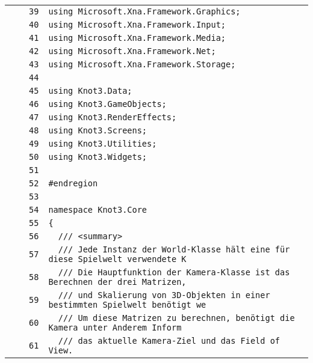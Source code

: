 \documentclass[a4paper,10pt]{article}
\begin{document}
\begin{longtable}[l]{lrrl}
\cellcolor{gray} &  & \verb~39~ & \verb~using Microsoft.Xna.Framework.Graphics;~\\
\cellcolor{gray} &  & \verb~40~ & \verb~using Microsoft.Xna.Framework.Input;~\\
\cellcolor{gray} &  & \verb~41~ & \verb~using Microsoft.Xna.Framework.Media;~\\
\cellcolor{gray} &  & \verb~42~ & \verb~using Microsoft.Xna.Framework.Net;~\\
\cellcolor{gray} &  & \verb~43~ & \verb~using Microsoft.Xna.Framework.Storage;~\\
\cellcolor{gray} &  & \verb~44~ & \verb~~\\
\cellcolor{gray} &  & \verb~45~ & \verb~using Knot3.Data;~\\
\cellcolor{gray} &  & \verb~46~ & \verb~using Knot3.GameObjects;~\\
\cellcolor{gray} &  & \verb~47~ & \verb~using Knot3.RenderEffects;~\\
\cellcolor{gray} &  & \verb~48~ & \verb~using Knot3.Screens;~\\
\cellcolor{gray} &  & \verb~49~ & \verb~using Knot3.Utilities;~\\
\cellcolor{gray} &  & \verb~50~ & \verb~using Knot3.Widgets;~\\
\cellcolor{gray} &  & \verb~51~ & \verb~~\\
\cellcolor{gray} &  & \verb~52~ & \verb~#endregion~\\
\cellcolor{gray} &  & \verb~53~ & \verb~~\\
\cellcolor{gray} &  & \verb~54~ & \verb~namespace Knot3.Core~\\
\cellcolor{gray} &  & \verb~55~ & \verb~{~\\
\cellcolor{gray} &  & \verb~56~ & \verb~  /// <summary>~\\
\cellcolor{gray} &  & \verb~57~ & \verb~  /// Jede Instanz der World-Klasse hält eine für diese Spielwelt verwendete K~\\
\cellcolor{gray} &  & \verb~58~ & \verb~  /// Die Hauptfunktion der Kamera-Klasse ist das Berechnen der drei Matrizen,~\\
\cellcolor{gray} &  & \verb~59~ & \verb~  /// und Skalierung von 3D-Objekten in einer bestimmten Spielwelt benötigt we~\\
\cellcolor{gray} &  & \verb~60~ & \verb~  /// Um diese Matrizen zu berechnen, benötigt die Kamera unter Anderem Inform~\\
\cellcolor{gray} &  & \verb~61~ & \verb~  /// das aktuelle Kamera-Ziel und das Field of View.~\\

\end{longtable}
\end{document}
